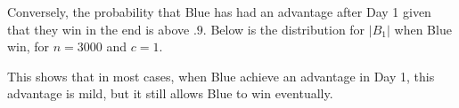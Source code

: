 \documentclass[12]{article}
\theoremstyle{definition}
\begin{document}
Conversely, the probability that Blue has had an advantage after Day 1 given that they win in the end is above $.9$. Below is the distribution for $|B_1|$ when Blue win, for $n = 3000$ and $c = 1$.

\smallskip


\bigskip

This shows that in most cases, when Blue achieve an advantage in Day 1, this advantage is mild, but it still allows Blue to win eventually.

%
%

\end{document}
